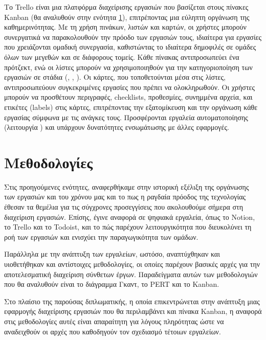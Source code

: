                 Το Trello \cite{Trello} είναι μια πλατφόρμα διαχείρισης εργασιών που βασίζεται στους πίνακες Kanban (θα αναλυθούν στην ενότητα \ref{sec:methodologies}), επιτρέποντας μια εύληπτη οργάνωση της καθημερινότητας. Με τη χρήση πινάκων, λιστών και καρτών, οι χρήστες μπορούν συνεργατικά να παρακολουθούν την πρόοδο των εργασιών τους, ιδιαίτερα για εργασίες που χρειάζονται ομαδική συνεργασία, καθιστώντας το ιδιαίτερα δημοφιλές σε ομάδες όλων των μεγεθών και σε διάφορους τομείς. Κάθε πίνακας αντιπροσωπεύει ένα πρότζεκτ, ενώ οι λίστες μπορούν να χρησιμοποιηθούν για την κατηγοριοποίηση των εργασιών σε στάδια (, , ). Οι κάρτες, που τοποθετούνται μέσα στις λίστες, αντιπροσωπεύουν συγκεκριμένες εργασίες που πρέπει να ολοκληρωθούν. Οι χρήστες μπορούν να προσθέτουν περιγραφές, checklists, προθεσμίες, συνημμένα αρχεία, και ετικέτες (labels) στις κάρτες, επιτρέποντας την εξατομίκευση και την οργάνωση κάθε εργασίας σύμφωνα με τις ανάγκες τους. Προσφέρονται εργαλεία αυτοματοποίησης (λειτουργία ) και υπάρχουν δυνατότητες ενσωμάτωσης με άλλες εφαρμογές.


    \section{Μεθοδολογίες} \label{sec:methodologies}
        Στις προηγούμενες ενότητες, αναφερθήκαμε στην ιστορική εξέλιξη της οργάνωσης των εργασιών και του χρόνου μας και το πως η ραγδαία πρόοδος της τεχνολογίας έθεσαν τα θεμέλια για τις σύγχρονες προσεγγίσεις που ακολουθούμε σήμερα στη διαχείριση εργασιών. Επίσης, έγινε αναφορά σε ψηφιακά εργαλεία, όπως το Notion, το Trello και το Todoist, και το πώς παρέχουν λειτουργικότητα που διευκολύνει τη ροή των εργασιών και ενισχύει την παραγωγικότητα των ομάδων.

        Παράλληλα με την ανάπτυξη των εργαλείων, ωστόσο, αναπτύχθηκαν και υιοθετήθηκαν και αντίστοιχες μεθοδολογίες, οι οποίες παρέχουν βασικές αρχές για την αποτελεσματική διαχείριση σύνθετων έργων. Παραδείγματα αυτών των μεθοδολογιών που θα αναλυθούν είναι το διάγραμμα Γκαντ, το PERT και το Kanban.

        Στο πλαίσιο της παρούσας διπλωματικής, η οποία επικεντρώνεται στην ανάπτυξη μιας εφαρμογής διαχείρισης εργασιών που θα περιλαμβάνει και πίνακα Kanban, η αναφορά στις μεθοδολογίες αυτές είναι απαραίτητη για λόγους πληρότητας ώστε να αναδειχθούν οι αρχές που καθοδηγούν τον σχεδιασμό τέτοιων εργαλείων.

